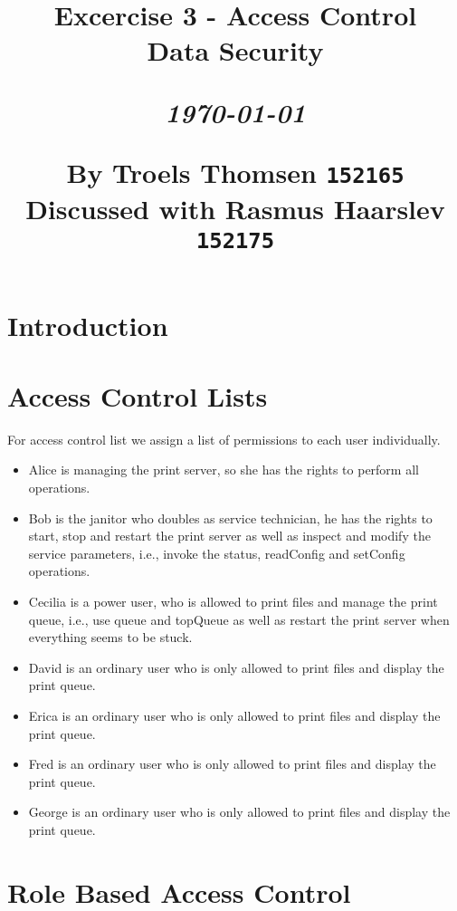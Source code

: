 \documentclass[12pt]{article}
\title{
  \vspace{4cm}
  \begin{flushleft}
  \Large{\textbf{Excercise 3 - Access Control}} \\
  \large{Data Security} \\
  \end{flushleft}
  \vspace{0cm}
  \begin{flushleft}
  \small
  \textit{\today}
  \end{flushleft}
  \vspace{12cm}
  \begin{flushleft}
  \small
  By Troels Thomsen \texttt{152165}\\
  Discussed with Rasmus Haarslev \texttt{152175}
  \end{flushleft}
}
\date{
}
\begin{document}
\clearpage
{}
\thispagestyle{empty}
\maketitle

\newpage

\tableofcontents

\newpage


\section{Introduction}
\label{sec:Introduction}

\newpage

\section{Access Control Lists}
\label{sec:Access Control Lists}

For access control list we assign a list of permissions to each user individually. 

\begin{itemize}
    \item Alice is managing the print server, so she has the rights to perform all operations.
    \item Bob is the janitor who doubles as service technician, he has the rights to start, stop and restart the print server as well as inspect and modify the service parameters, i.e., invoke the status, readConfig and setConfig operations.
    \item Cecilia is a power user, who is allowed to print files and manage the print queue, i.e., use queue and topQueue as well as restart the print server when everything seems to be stuck.
    \item David is an ordinary user who is only allowed to print files and display the print queue.
    \item Erica is an ordinary user who is only allowed to print files and display the print queue.
    \item Fred is an ordinary user who is only allowed to print files and display the print queue.
    \item George is an ordinary user who is only allowed to print files and display the print queue.
\end{itemize}


\newpage

\section{Role Based Access Control}
\label{sec:Role Based Access Control}
\end{document}
